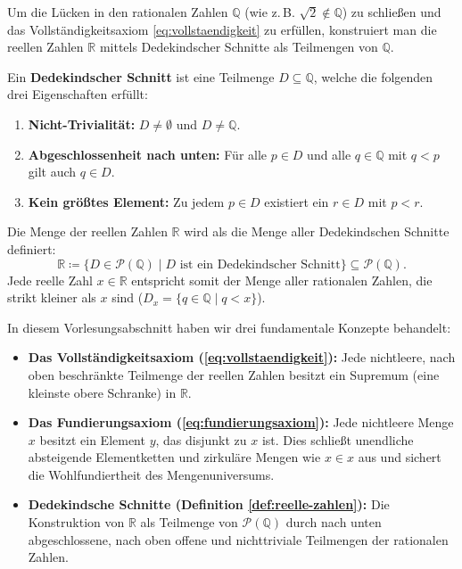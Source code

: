 \begin{math-stroke}
Um die Lücken in den rationalen Zahlen $\mathbb{Q}$ (wie z.\,B. $\sqrt{2} \notin \mathbb{Q}$) zu schließen und das Vollständigkeitsaxiom \eqref{eq:vollstaendigkeit} zu erfüllen, konstruiert man die reellen Zahlen $\mathbb{R}$ mittels Dedekindscher Schnitte als Teilmengen von $\mathbb{Q}$.

\begin{definition}\label{def:reelle-zahlen}
Ein \textbf{Dedekindscher Schnitt} ist eine Teilmenge $D \subseteq \mathbb{Q}$, welche die folgenden drei Eigenschaften erfüllt:
\begin{enumerate}[label=\textbf{(\roman*)}]
    \item \textbf{Nicht-Trivialität:} $D \neq \emptyset$ und $D \neq \mathbb{Q}$.
    \item \textbf{Abgeschlossenheit nach unten:} Für alle $p \in D$ und alle $q \in \mathbb{Q}$ mit $q < p$ gilt auch $q \in D$.
    \item \textbf{Kein größtes Element:} Zu jedem $p \in D$ existiert ein $r \in D$ mit $p < r$.
\end{enumerate}
Die Menge der reellen Zahlen $\mathbb{R}$ wird als die Menge aller Dedekindschen Schnitte definiert:
\[
\mathbb{R} \coloneq \{ D \in \mathcal{P}(\mathbb{Q}) \mid D \text{ ist ein Dedekindscher Schnitt} \} \subseteq \mathcal{P}(\mathbb{Q}).
\]
Jede reelle Zahl $x \in \mathbb{R}$ entspricht somit der Menge aller rationalen Zahlen, die strikt kleiner als $x$ sind ($D_x = \{ q \in \mathbb{Q} \mid q < x \}$).
\end{definition}
\end{math-stroke}

\begin{nice-box}
In diesem Vorlesungsabschnitt haben wir drei fundamentale Konzepte behandelt:
\begin{itemize}
    \item \textbf{Das Vollständigkeitsaxiom (\eqref{eq:vollstaendigkeit}):} Jede nichtleere, nach oben beschränkte Teilmenge der reellen Zahlen besitzt ein Supremum (eine kleinste obere Schranke) in $\mathbb{R}$.
    \item \textbf{Das Fundierungsaxiom (\eqref{eq:fundierungsaxiom}):} Jede nichtleere Menge $x$ besitzt ein Element $y$, das disjunkt zu $x$ ist. Dies schließt unendliche absteigende Elementketten und zirkuläre Mengen wie $x \in x$ aus und sichert die Wohlfundiertheit des Mengenuniversums.
    \item \textbf{Dedekindsche Schnitte (Definition \ref{def:reelle-zahlen}):} Die Konstruktion von $\mathbb{R}$ als Teilmenge von $\mathcal{P}(\mathbb{Q})$ durch nach unten abgeschlossene, nach oben offene und nichttriviale Teilmengen der rationalen Zahlen.
\end{itemize}
\end{nice-box}

